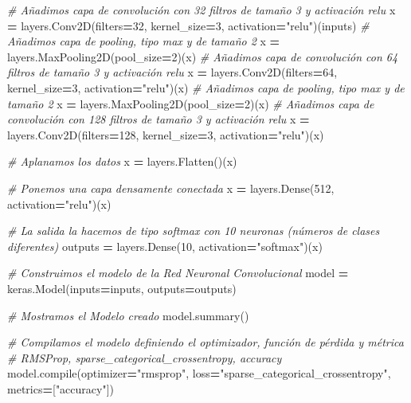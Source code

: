\documentclass[
  a4paper,
  DIV=11,
  numbers=noendperiod]{scrreprt}
\newenvironment{Shaded}{\begin{snugshade}}{\end{snugshade}}
\newcommand{\BuiltInTok}[1]{#1}
\newcommand{\CommentTok}[1]{\textcolor[rgb]{0.56,0.35,0.01}{\textit{#1}}}
\newcommand{\DecValTok}[1]{\textcolor[rgb]{0.00,0.00,0.81}{#1}}
\newcommand{\NormalTok}[1]{#1}
\newcommand{\OperatorTok}[1]{\textcolor[rgb]{0.81,0.36,0.00}{\textbf{#1}}}
\newcommand{\StringTok}[1]{\textcolor[rgb]{0.31,0.60,0.02}{#1}}
\begin{document}
\begin{Shaded}
\begin{Highlighting}[numbers=left,,]
\CommentTok{\# Añadimos capa de convolución con 32 filtros de tamaño 3 y activación relu}
\NormalTok{x }\OperatorTok{=}\NormalTok{ layers.Conv2D(filters}\OperatorTok{=}\DecValTok{32}\NormalTok{, kernel\_size}\OperatorTok{=}\DecValTok{3}\NormalTok{, activation}\OperatorTok{=}\StringTok{"relu"}\NormalTok{)(inputs)}
\CommentTok{\# Añadimos capa de pooling, tipo max y de tamaño 2}
\NormalTok{x }\OperatorTok{=}\NormalTok{ layers.MaxPooling2D(pool\_size}\OperatorTok{=}\DecValTok{2}\NormalTok{)(x)}
\CommentTok{\# Añadimos capa de convolución con 64 filtros de tamaño 3 y activación relu}
\NormalTok{x }\OperatorTok{=}\NormalTok{ layers.Conv2D(filters}\OperatorTok{=}\DecValTok{64}\NormalTok{, kernel\_size}\OperatorTok{=}\DecValTok{3}\NormalTok{, activation}\OperatorTok{=}\StringTok{"relu"}\NormalTok{)(x)}
\CommentTok{\# Añadimos capa de pooling, tipo max y de tamaño 2}
\NormalTok{x }\OperatorTok{=}\NormalTok{ layers.MaxPooling2D(pool\_size}\OperatorTok{=}\DecValTok{2}\NormalTok{)(x)}
\CommentTok{\# Añadimos capa de convolución con 128 filtros de tamaño 3 y activación relu}
\NormalTok{x }\OperatorTok{=}\NormalTok{ layers.Conv2D(filters}\OperatorTok{=}\DecValTok{128}\NormalTok{, kernel\_size}\OperatorTok{=}\DecValTok{3}\NormalTok{, activation}\OperatorTok{=}\StringTok{"relu"}\NormalTok{)(x)}

\CommentTok{\# Aplanamos los datos}
\NormalTok{x }\OperatorTok{=}\NormalTok{ layers.Flatten()(x)}

\CommentTok{\# Ponemos una capa densamente conectada}
\NormalTok{x }\OperatorTok{=}\NormalTok{ layers.Dense(}\DecValTok{512}\NormalTok{, activation}\OperatorTok{=}\StringTok{"relu"}\NormalTok{)(x)}

\CommentTok{\# La salida la hacemos de tipo softmax con 10 neuronas (números de clases diferentes)}
\NormalTok{outputs }\OperatorTok{=}\NormalTok{ layers.Dense(}\DecValTok{10}\NormalTok{, activation}\OperatorTok{=}\StringTok{"softmax"}\NormalTok{)(x)}

\CommentTok{\# Construimos el modelo de la Red Neuronal Convolucional}
\NormalTok{model }\OperatorTok{=}\NormalTok{ keras.Model(inputs}\OperatorTok{=}\NormalTok{inputs, outputs}\OperatorTok{=}\NormalTok{outputs)}

\CommentTok{\# Mostramos el Modelo creado}
\NormalTok{model.summary()}

\CommentTok{\# Compilamos el modelo definiendo el optimizador, función de pérdida y métrica}
\CommentTok{\# RMSProp, sparse\_categorical\_crossentropy, accuracy}
\NormalTok{model.}\BuiltInTok{compile}\NormalTok{(optimizer}\OperatorTok{=}\StringTok{"rmsprop"}\NormalTok{,}
\NormalTok{    loss}\OperatorTok{=}\StringTok{"sparse\_categorical\_crossentropy"}\NormalTok{,}
\NormalTok{    metrics}\OperatorTok{=}\NormalTok{[}\StringTok{"accuracy"}\NormalTok{])}


\end{Highlighting}
\end{Shaded}
\end{document}
